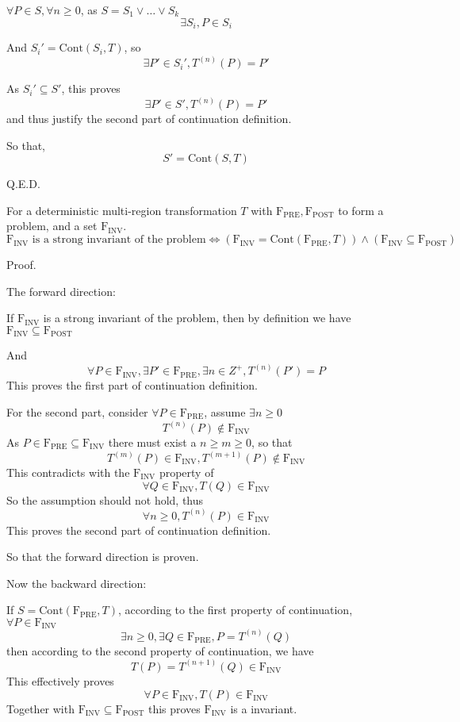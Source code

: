 \documentclass[letterpaper,]{article}
\providecommand{\tightlist}{%
  \setlength{\itemsep}{0pt}\setlength{\parskip}{0pt}}
\begin{document}
\(\forall P \in S, \forall n \ge 0\), as \(S = S_1 \lor \dots \lor S_k\)
\[\exists S_i, P \in S_i\]

And \(S_i' = \mathrm{Cont}(S_i, T)\), so
\[\exists P' \in S_i', T^{(n)}(P) = P'\]

As \(S_i' \subseteq S'\), this proves
\[\exists P' \in S', T^{(n)}(P) = P'\] and thus justify the second part
of continuation definition.

So that, \[S' = \mathrm{Cont}(S, T)\]

Q.E.D.

\begin{description}
\tightlist
\item[Lemma 7]
For a deterministic multi-region transformation \(T\) with
\(\mathrm{F_{PRE}}, \mathrm{F_{POST}}\) to form a problem, and a set
\(\mathrm{F_{INV}}\).
\[\mathrm{F_{INV}}\text{ is a strong invariant of the problem} \Leftrightarrow (\mathrm{F_{INV}}= \mathrm{Cont}(\mathrm{F_{PRE}}, T)) \land (\mathrm{F_{INV}}\subseteq \mathrm{F_{POST}})\]
\end{description}

Proof.

The forward direction:

If \(\mathrm{F_{INV}}\) is a strong invariant of the problem, then by
definition we have \(\mathrm{F_{INV}}\subseteq \mathrm{F_{POST}}\)

And
\[\forall P \in \mathrm{F_{INV}}, \exists P' \in \mathrm{F_{PRE}}, \exists n \in Z^{+}, T^{(n)}(P') = P\]
This proves the first part of continuation definition.

For the second part, consider \(\forall P \in \mathrm{F_{PRE}}\), assume
\(\exists n \ge 0\) \[T^{(n)}(P) \notin \mathrm{F_{INV}}\] As
\(P\in \mathrm{F_{PRE}}\subseteq \mathrm{F_{INV}}\) there must exist a
\(n\ge m\ge 0\), so that
\[T^{(m)}(P) \in \mathrm{F_{INV}}, T^{(m + 1)}(P) \notin \mathrm{F_{INV}}\]
This contradicts with the \(\mathrm{F_{INV}}\) property of
\[\forall Q \in \mathrm{F_{INV}}, T(Q) \in \mathrm{F_{INV}}\] So the
assumption should not hold, thus
\[\forall n \ge 0, T^{(n)}(P) \in \mathrm{F_{INV}}\] This proves the
second part of continuation definition.

So that the forward direction is proven.

Now the backward direction:

If \(S = \mathrm{Cont}(\mathrm{F_{PRE}}, T)\), according to the first
property of continuation, \(\forall P \in \mathrm{F_{INV}}\)
\[\exists n\ge 0, \exists Q \in \mathrm{F_{PRE}}, P = T^{(n)}(Q)\] then
according to the second property of continuation, we have
\[T(P) = T^{(n+1)}(Q) \in \mathrm{F_{INV}}\] This effectively proves
\[\forall P \in \mathrm{F_{INV}}, T(P) \in \mathrm{F_{INV}}\] Together
with \(\mathrm{F_{INV}}\subseteq \mathrm{F_{POST}}\) this proves
\(\mathrm{F_{INV}}\) is a invariant.
\end{document}
